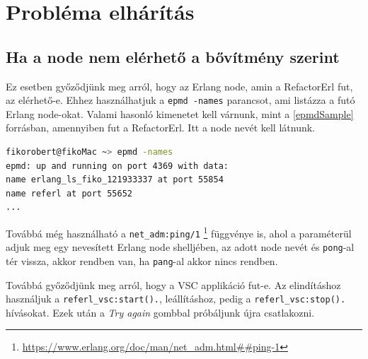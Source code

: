 \section{Probléma elhárítás}
\subsection{Ha a node nem elérhető a bővítmény szerint} \label{not_reachable_node}

Ez esetben győződjünk meg arról, hogy az Erlang node, amin a RefactorErl fut, az elérhető-e. Ehhez használhatjuk a \lstinline{epmd -names} parancsot, ami listázza a futó Erlang node-okat.
Valami hasonló kimenetet kell várnunk, mint a \ref{epmdSample} forrásban, amennyiben fut a RefactorErl. Itt a node nevét kell látnunk.

\lstset{caption=Erlang Port Mapper Deamon (epmd) példa kimenete, label=src:sh}  \label{epmdSample}
\begin{lstlisting}[language={sh}] 
fikorobert@fikoMac ~> epmd -names
epmd: up and running on port 4369 with data:
name erlang_ls_fiko_121933337 at port 55854
name referl at port 55652
...
\end{lstlisting}


Továbbá még használható a \lstinline{net_adm:ping/1} \footnote{\url{https://www.erlang.org/doc/man/net_adm.html##ping-1}} függvénye is, ahol a paraméterül adjuk meg egy nevesített Erlang node shelljében, az adott node nevét és \lstinline{pong}-al tér vissza, akkor rendben van, ha \lstinline{pang}-al akkor nincs rendben.

Továbbá győződjünk meg arról, hogy a VSC applikáció fut-e. Az elindításhoz használjuk a \lstinline{referl_vsc:start().}, leállításhoz, pedig a \lstinline{referl_vsc:stop().} hívásokat. Ezek után a \textit{Try again} gombbal próbáljunk újra csatlakozni.
